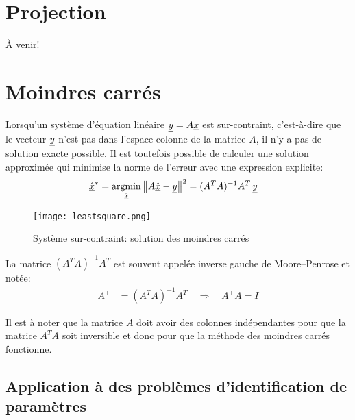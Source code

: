 \section{Projection}
\label{sec:projectionmatrix}

À venir!

\newpage
\section{Moindres carrés}
\label{sec:moindrecarre}

Lorsqu'un système d'équation linéaire $\underline{y} = A \underline{x}$ est sur-contraint, c'est-à-dire que le vecteur $\underline{y}$ n'est pas dans l'espace colonne de la matrice $A$, il n'y a pas de solution exacte possible. Il est toutefois possible de calculer une solution approximée qui minimise la norme de l'erreur avec une expression explicite:
\begin{align}
	\col{\hat{x}}^* &= \operatornamewithlimits{argmin}\limits_{\col{\hat{x}}} \left\| A \col{\hat{x}} - \col{y} \right\|^2
	= (A^T A)^{-1} A^T \, \col{y}
\end{align}
\begin{figure}[htbp]
	\centering
	\texttt{[image: leastsquare.png]}
	\caption{Système sur-contraint: solution des moindres carrés}
	\label{fig:leastsquare}
\end{figure}

La matrice $(A^T A)^{-1} A^T$ est souvent appelée inverse gauche de Moore–Penrose et notée:
\begin{align}
	A^{+} &= (A^T A)^{-1} A^T  \quad \Rightarrow \quad A^{+} A = I
\end{align}

Il est à noter que la matrice $A$ doit avoir des colonnes indépendantes pour que la matrice $A^T A$ soit inversible et donc pour que la méthode des moindres carrés fonctionne.


\subsection{Application à des problèmes d'identification de paramètres}


